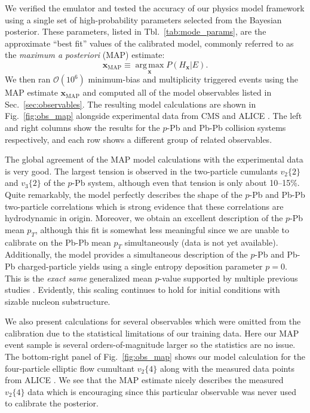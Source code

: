 \documentclass[aps,prc,reprint,amsmath,nofootinbib]{revtex4-1}
\newcommand{\vnk}[2]{v_#1\{#2\}}
\newcommand{\x}{\mathbf x}
\newcommand{\order}[1]{$\mathcal O(10^{#1})$}
\begin{document}
We verified the emulator and tested the accuracy of our physics model framework using a single set of high-probability parameters selected from the Bayesian posterior.
These parameters, listed in Tbl.~\ref{tab:mode_params}, are the approximate ``best fit'' values of the calibrated model, commonly referred to as the \emph{maximum a posteriori} (MAP) estimate:
\begin{equation}
  \x_\mathrm{MAP} \equiv \operatorname*{arg\, max}_{\x} P(H_\x | E).
\end{equation}
We then ran \order{6} minimum-bias and multiplicity triggered events using the MAP estimate $\x_\mathrm{MAP}$ and computed all of the model observables listed in Sec.~\ref{sec:observables}.
The resulting model calculations are shown in Fig.~\ref{fig:obs_map} alongside experimental data from CMS \cite{Chatrchyan:2013nka} and ALICE \cite{Adam:2015ptt, Adam:2016izf, Adam:2014qja, Abelev:2013bla}.
The left and right columns show the results for the $p$-Pb and Pb-Pb collision systems respectively, and each row shows a different group of related observables.

The global agreement of the MAP model calculations with the experimental data is very good.
The largest tension is observed in the two-particle cumulants $\vnk{2}{2}$ and $\vnk{3}{2}$ of the $p$-Pb system, although even that tension is only about 10--15\%.
Quite remarkably, the model perfectly describes the shape of the $p$-Pb and Pb-Pb two-particle correlations which is strong evidence that these correlations are hydrodynamic in origin.
Moreover, we obtain an excellent description of the \mbox{$p$-Pb} mean $p_T$, although this fit is somewhat less meaningful since we are unable to calibrate on the Pb-Pb mean $p_T$ simultaneously (data is not yet available).
Additionally, the model provides a simultaneous description of the \mbox{$p$-Pb} and Pb-Pb charged-particle yields using a single entropy deposition parameter $p=0$.
This is the \emph{exact same} generalized mean $p$-value supported by multiple previous studies \cite{Moreland:2014oya, Bernhard:2016tnd, Ke:2016jrd, Bernhard:2018hnz}.
Evidently, this scaling continues to hold for initial conditions with sizable nucleon substructure.

We also present calculations for several observables which were omitted from the calibration due to the statistical limitations of our training data.
Here our MAP event sample is several orders-of-magnitude larger so the statistics are no issue.
The bottom-right panel of Fig.~\ref{fig:obs_map} shows our model calculation for the four-particle elliptic flow cumultant $\vnk{2}{4}$ along with the measured data points from \mbox{ALICE} \cite{Adam:2016izf}.
We see that the MAP estimate nicely describes the measured $\vnk{2}{4}$ data which is encouraging since this particular observable was never used to calibrate the posterior.
\end{document}
